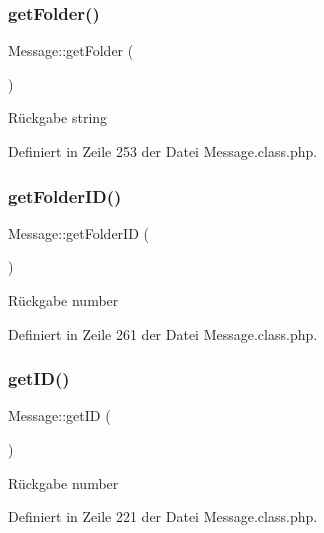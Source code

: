 \subsubsection{\texorpdfstring{get\+Folder()}{getFolder()}}
{\footnotesize\ttfamily Message\+::get\+Folder (\begin{DoxyParamCaption}{ }\end{DoxyParamCaption})}

\begin{DoxyReturn}{Rückgabe}
string 
\end{DoxyReturn}


Definiert in Zeile 253 der Datei Message.\+class.\+php.

\mbox{\label{class_message_af11d1ffcd82000fd7d45a779f06e6e8d}} 
\subsubsection{\texorpdfstring{get\+Folder\+I\+D()}{getFolderID()}}
{\footnotesize\ttfamily Message\+::get\+Folder\+ID (\begin{DoxyParamCaption}{ }\end{DoxyParamCaption})}

\begin{DoxyReturn}{Rückgabe}
number 
\end{DoxyReturn}


Definiert in Zeile 261 der Datei Message.\+class.\+php.

\mbox{\label{class_message_a07429231dde016151f678c032841f4c9}} 
\subsubsection{\texorpdfstring{get\+I\+D()}{getID()}}
{\footnotesize\ttfamily Message\+::get\+ID (\begin{DoxyParamCaption}{ }\end{DoxyParamCaption})}

\begin{DoxyReturn}{Rückgabe}
number 
\end{DoxyReturn}


Definiert in Zeile 221 der Datei Message.\+class.\+php.

